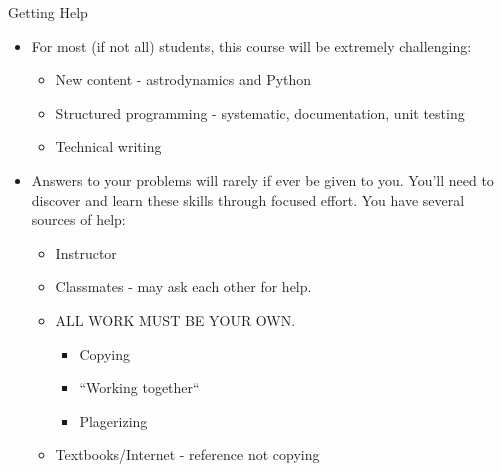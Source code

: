 \documentclass[11pt,professionalfonts]{beamer}
\begin{document}
\begin{frame}{Getting Help}
    \begin{itemize}
        \item For most (if not all) students, this course will be extremely challenging:
            \begin{itemize}
                \item New content - astrodynamics and Python
                \item Structured programming - systematic, documentation, unit testing
                \item Technical writing 
            \end{itemize}
        \item Answers to your problems will rarely if ever be given to you. 
            You'll need to discover and learn these skills through focused effort.
            You have several sources of help:
            \begin{itemize}
                \item Instructor
                \item Classmates - may ask each other for help.
                \item ALL WORK MUST BE YOUR OWN.
                    \begin{itemize}
                        \item Copying
                        \item ``Working together``
                        \item Plagerizing
                    \end{itemize}
                \item Textbooks/Internet - reference not copying
            \end{itemize}
    \end{itemize}
\end{frame}
\end{document}
